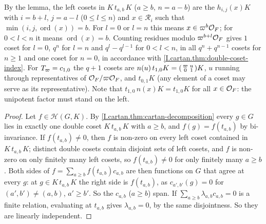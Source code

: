 \begin{remark}\label{rem:satake-coset-list}
By the lemma, the left cosets in $K\,t_{a,b}\,K$ ($a\ge b$, $n=a-b$) are the $h_{i,j}(x)K$ with $i=b+l$, $j=a-l$
($0\le l\le n$) and $x\in\mathcal R_i$ such that $\min(i,j,\operatorname{ord}(x))=b$. For $l=0$ or $l=n$ this means
$x\in\varpi^b\mathcal{O}_F$; for $0<l<n$ it means $\operatorname{ord}(x)=b$. Counting residues modulo $\varpi^{b+l}\mathcal{O}_F$
gives $1$ coset for $l=0$, $q^n$ for $l=n$ and $q^l-q^{l-1}$ for $0<l<n$, in all $q^n+q^{n-1}$ cosets for $n\ge1$ and one
coset for $n=0$, in accordance with \cref{I.cartan.thm:double-coset-index}. For $T_\varpi=c_{1,0}$ the $q+1$ cosets are
$n(u)\,t_{1,0}K=\begin{psmallmatrix}\varpi&u\\0&1\end{psmallmatrix}K$, $u$ running through representatives of
$\mathcal{O}_F/\varpi\mathcal{O}_F$, and $t_{0,1}K$ (any element of a coset may serve as its representative). Note that
$t_{1,0}\,n(x)K=t_{1,0}K$ for all $x\in\mathcal{O}_F$: the unipotent factor must stand on the left.
\end{remark}

\begin{theorem}
\end{theorem}
\begin{proof}
Let $f\in\mathcal H(G,K)$. By \cref{I.cartan.thm:cartan-decomposition} every $g\in G$ lies in exactly one double
coset $K\,t_{a,b}\,K$ with $a\ge b$, and $f(g)=f(t_{a,b})$ by bi-invariance. If $f(t_{a,b})\neq0$, then $f$ is non-zero
on every left coset contained in $K\,t_{a,b}\,K$; distinct double cosets contain disjoint sets of left cosets, and $f$
is non-zero on only finitely many left cosets, so $f(t_{a,b})\neq0$ for only finitely many $a\ge b$. Both sides of
$f=\sum_{a\ge b}f(t_{a,b})c_{a,b}$ are then functions on $G$ that agree at every $g$: at $g\in K\,t_{a,b}\,K$ the right
side is $f(t_{a,b})$, as $c_{a',b'}(g)=0$ for $(a',b')\neq(a,b)$, $a'\ge b'$. So the $c_{a,b}$ ($a\ge b$) span.
If $\sum_{a\ge b}\lambda_{a,b}c_{a,b}=0$ is a finite relation, evaluating at $t_{a,b}$ gives $\lambda_{a,b}=0$, by
the same disjointness. So they are linearly independent.
\end{proof}

